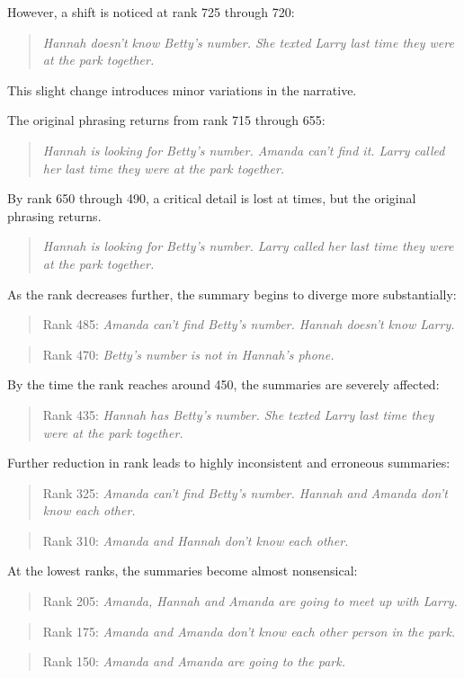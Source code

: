 However, a shift is noticed at rank 725 through 720:
\begin{quote}
    \textit{Hannah doesn't know Betty's number. She texted Larry last time they were at the park together.}
\end{quote}

This slight change introduces minor variations in the narrative.

The original phrasing returns from rank 715 through 655:
\begin{quote}
    \textit{Hannah is looking for Betty's number. Amanda can't find it. Larry called her last time they were at the park together.}
\end{quote}

By rank 650 through 490, a critical detail is lost at times, but the original phrasing returns.
\begin{quote}
    \textit{Hannah is looking for Betty's number. Larry called her last time they were at the park together.}
\end{quote}

As the rank decreases further, the summary begins to diverge more substantially:
\begin{quote}
    Rank 485: \textit{Amanda can't find Betty's number. Hannah doesn't know Larry.}
\end{quote}
\begin{quote}
    Rank 470: \textit{Betty's number is not in Hannah's phone.}
\end{quote}

By the time the rank reaches around 450, the summaries are severely affected:
\begin{quote}
    Rank 435: \textit{Hannah has Betty's number. She texted Larry last time they were at the park together.}
\end{quote}

Further reduction in rank leads to highly inconsistent and erroneous summaries:
\begin{quote}
    Rank 325: \textit{Amanda can't find Betty's number. Hannah and Amanda don't know each other.}
\end{quote}
\begin{quote}
    Rank 310: \textit{Amanda and Hannah don't know each other.}
\end{quote}

At the lowest ranks, the summaries become almost nonsensical:
\begin{quote}
    Rank 205: \textit{Amanda, Hannah and Amanda are going to meet up with Larry.}
\end{quote}
\begin{quote}
    Rank 175: \textit{Amanda and Amanda don't know each other person in the park.}
\end{quote}
\begin{quote}
    Rank 150: \textit{Amanda and Amanda are going to the park.}
\end{quote}


